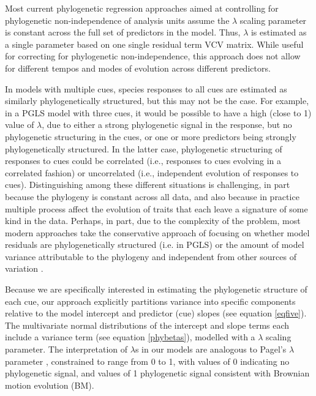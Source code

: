 \documentclass[11pt]{article}
\begin{document}
Most current phylogenetic regression approaches aimed at controlling for phylogenetic non-independence of analysis units \citep[i.e. usually species, see][]{revell2010phylogenetic} assume the $\lambda$ scaling parameter is constant across the full set of predictors in the model. Thus, $\lambda$ is estimated as a single parameter based on one single residual term VCV matrix. While useful for correcting for phylogenetic non-independence, this approach does not allow for different tempos and modes of evolution across different predictors. 

In models with multiple cues, species responses to all cues are estimated as similarly phylogenetically structured, but this may not be the case. For example, in a PGLS model with three cues, it would be possible to have a high (close to 1) value of $\lambda$, due to either a strong phylogenetic signal in the response, but no phylogenetic structuring in the cues, or one or more predictors being strongly phylogenetically structured. In the latter case, phylogenetic structuring of responses to cues could be correlated (i.e., responses to cues evolving in a correlated fashion) or uncorrelated (i.e., independent evolution of responses to cues). Distinguishing among these different situations is challenging, in part because the phylogeny is constant across all data, and also because in practice multiple process affect the evolution of traits that each leave a signature of some kind in the data. Perhaps, in part, due to the complexity of the problem, most modern approaches take the conservative approach of focusing on whether model residuals are phylogenetically structured (i.e. in PGLS) or the amount of model variance attributable to the phylogeny and independent from other sources of variation \citep[i.e., in PMM, see][]{housworth2004phylogenetic}.

Because we are specifically interested in estimating the phylogenetic structure of each cue, our approach explicitly partitions variance into specific components relative to the model intercept and predictor (cue) slopes (see equation \ref{eqfive}). The multivariate normal distributions of the intercept and slope terms each include a variance term (see equation \ref{phybetas}), modelled with a $\lambda$ scaling parameter. The interpretation of $\lambda$s in our models are analogous to Pagel's $\lambda$  \citep{pagel1999inferring} parameter \citep{housworth2004phylogenetic}, constrained to range from 0 to 1, with values of 0 indicating no phylogenetic signal, and values of 1 phylogenetic signal consistent with Brownian motion evolution (BM). 
\end{document}
